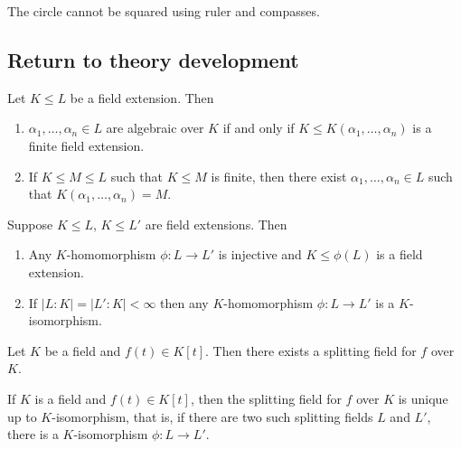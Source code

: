 \documentclass{article}
\begin{document}
\begin{nthm}\label{thm:1.18}
    The circle cannot be squared using ruler and compasses.
\end{nthm}

\subsection{Return to theory development}
\begin{nlemma}\label{lem:1.19}
    Let $K \leq L$ be a field extension. Then
    \begin{enumerate}[label=(\roman*)]
        \item $\alpha_1, \dotsc, \alpha_n \in L$ are algebraic over $K$ if and only if $K \leq K(\alpha_1, \dotsc, \alpha_n)$ is a finite field extension.
        \item If $K \leq M \leq L$ such that $K \leq M$ is finite, then there exist $\alpha_1, \dotsc, \alpha_n \in L$ such that $K(\alpha_1, \dotsc, \alpha_n) = M$.
    \end{enumerate}
\end{nlemma}



\begin{nlemma}\label{lem:1.21}
    Suppose $K \leq L$, $K \leq L'$ are field extensions. Then
    \begin{enumerate}[label=(\roman*)]
        \item Any $K$-homomorphism $\phi:L \to L'$ is injective and $K \leq \phi(L)$ is a field extension.
        \item If $|L:K| = |L':K| < \infty$ then any $K$-homomorphism $\phi:L \to L'$ is a $K$-isomorphism.
    \end{enumerate}
\end{nlemma}





\begin{nthm}\label{thm:1.23}
    Let $K$ be a field and $f(t) \in K[t]$. Then there exists a splitting field for $f$ over $K$.
\end{nthm}

\begin{nthm}\label{thm:1.24}
    If $K$ is a field and $f(t) \in K[t]$, then the splitting field for $f$ over $K$ is unique up to $K$-isomorphism, that is, if there are two such splitting fields $L$ and $L'$, there is a $K$-isomorphism $\phi: L \to L'$.
\end{nthm}
\end{document}
